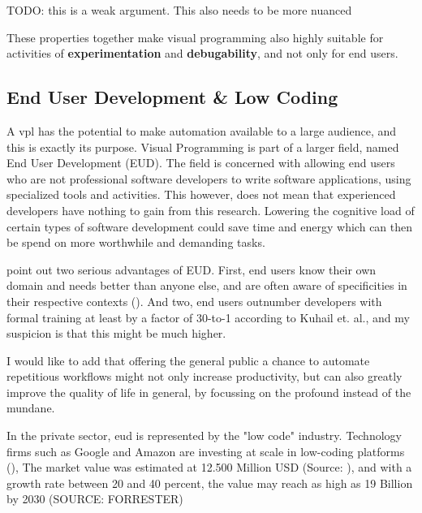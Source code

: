 \begin{note}
  TODO: this is a weak argument. This also needs to be more nuanced
\end{note}


These properties together make visual programming also highly suitable for activities of \textbf{experimentation} and \textbf{debugability}, and not only for end users. 


\subsection{End User Development \& Low Coding}
A \ac{vpl} has the potential to make automation available to a large audience, and this is exactly its purpose. 
Visual Programming is part of a larger field, named End User Development (EUD). 
The field is concerned with allowing end users who are not professional software developers to write software applications, using specialized tools and activities. 
This however, does not mean that experienced developers have nothing to gain from this research. 
Lowering the cognitive load of certain types of software development could save time and energy which can then be spend on more worthwhile and demanding tasks. 

\cite{kuhail_characterizing_2021} point out two serious advantages of EUD. 
First, end users know their own domain and needs better than anyone else, and are often aware of specificities in their respective contexts (\cite{kuhail_characterizing_2021}). 
And two, end users outnumber developers with formal training at least by a factor of 30-to-1 according to Kuhail et. al., and my suspicion is that this might be much higher.

I would like to add that offering the general public a chance to automate repetitious workflows might not only increase productivity, but can also greatly improve the quality of life in general, by focussing on the profound instead of the mundane. 

In the private sector, \ac{eud} is represented by the "low code" industry. 
Technology firms such as Google and Amazon are investing at scale in low-coding platforms (\cite{kuhail_characterizing_2021}),
The market value was estimated at 12.500 Million USD (Source: ), and with a growth rate between 20 and 40 percent, the value may reach as high as 19 Billion by 2030 (SOURCE: FORRESTER) 

